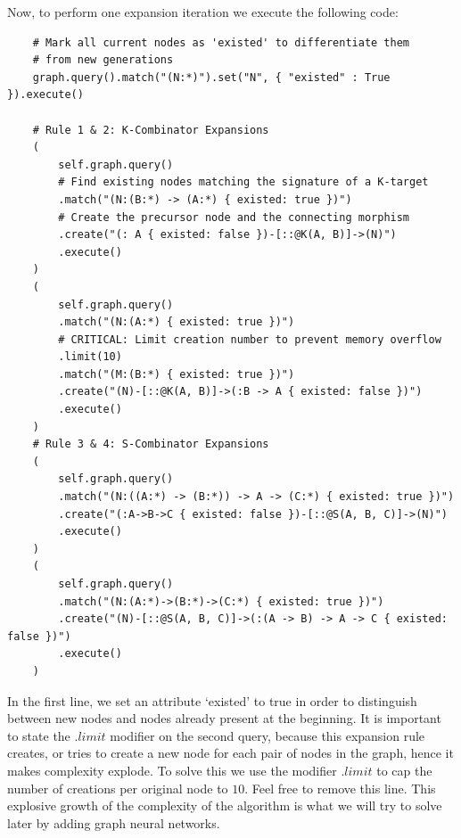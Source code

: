 Now, to perform one expansion iteration we execute the following code:
\begin{verbatim}
    # Mark all current nodes as 'existed' to differentiate them 
    # from new generations
    graph.query().match("(N:*)").set("N", { "existed" : True }).execute()

    # Rule 1 & 2: K-Combinator Expansions
    (
        self.graph.query()
        # Find existing nodes matching the signature of a K-target
        .match("(N:(B:*) -> (A:*) { existed: true })")
        # Create the precursor node and the connecting morphism
        .create("(: A { existed: false })-[::@K(A, B)]->(N)")
        .execute()
    )
    (
        self.graph.query()
        .match("(N:(A:*) { existed: true })")
        # CRITICAL: Limit creation number to prevent memory overflow
        .limit(10)
        .match("(M:(B:*) { existed: true })")
        .create("(N)-[::@K(A, B)]->(:B -> A { existed: false })")
        .execute()
    )
    # Rule 3 & 4: S-Combinator Expansions
    (
        self.graph.query()
        .match("(N:((A:*) -> (B:*)) -> A -> (C:*) { existed: true })")
        .create("(:A->B->C { existed: false })-[::@S(A, B, C)]->(N)")
        .execute()
    )
    (
        self.graph.query()
        .match("(N:(A:*)->(B:*)->(C:*) { existed: true })")
        .create("(N)-[::@S(A, B, C)]->(:(A -> B) -> A -> C { existed: false })")
        .execute()
    )
\end{verbatim}
In the first line, we set an attribute `existed' to true in order to distinguish between new nodes and nodes already present at the beginning.
It is important to state the $.limit$ modifier on the second query, because this expansion rule creates, or tries to create
a new node for each pair of nodes in the graph, hence it makes complexity explode. To solve this we use the modifier $.limit$
to cap the number of creations per original node to $10$. Feel free to remove this line. 
This explosive growth of the complexity of the algorithm is what we will try to solve later by adding graph neural networks. 

